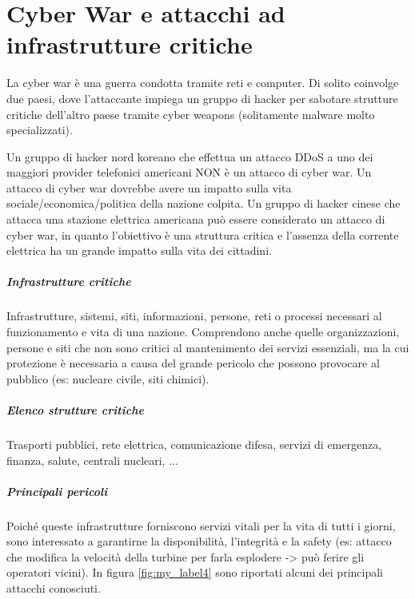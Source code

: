\chapter{Cyber War e attacchi ad infrastrutture critiche}
La cyber war è una guerra condotta tramite reti e computer. Di solito coinvolge due paesi, dove l'attaccante impiega un gruppo di hacker per sabotare strutture critiche dell'altro paese tramite cyber weapons (solitamente malware molto specializzati). 

Un gruppo di hacker nord koreano che effettua un attacco DDoS a uno dei maggiori provider telefonici americani NON è un attacco di cyber war. Un attacco di cyber war dovrebbe avere un impatto sulla vita sociale/economica/politica della nazione colpita. 
Un gruppo di hacker cinese che attacca una stazione elettrica americana può essere considerato un attacco di cyber war, in quanto l'obiettivo è una struttura critica e l'assenza della corrente elettrica ha un grande impatto sulla vita dei cittadini.

\paragraph{Infrastrutture critiche} Infrastrutture, sistemi, siti, informazioni, persone, reti o processi necessari al funzionamento e vita di una nazione. Comprendono anche quelle organizzazioni, persone e siti che non sono critici al mantenimento dei servizi essenziali, ma la cui protezione è necessaria a causa del grande pericolo che possono provocare al pubblico (es: nucleare civile, siti chimici).

\paragraph{Elenco strutture critiche} Trasporti pubblici, rete elettrica, comunicazione difesa, servizi di emergenza, finanza, salute, centrali nucleari, ...

\paragraph{Principali pericoli} Poiché queste infrastrutture forniscono servizi vitali per la vita di tutti i giorni, sono interessato a garantirne la disponibilità, l'integrità e la safety (es: attacco che modifica la velocità della turbine per farla esplodere -> può ferire gli operatori vicini). In figura \ref{fig:my_label4} sono riportati alcuni dei principali attacchi conosciuti.

